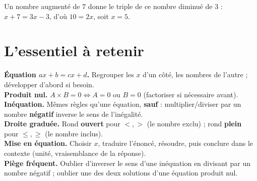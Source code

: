 \begin{illus}
\end{illus}

\begin{exemple}
Un nombre augmenté de $7$ donne le triple de ce nombre diminué de $3$ : $x+7=3x-3$, d'où
$10=2x$, soit $x=5$.
\end{exemple}

\section{L'essentiel à retenir}

\begin{synthese}
\textbf{Équation $ax+b=cx+d$.} Regrouper les $x$ d'un côté, les nombres de l'autre ;
développer d'abord si besoin.\\[4pt]
\textbf{Produit nul.} $A\times B=0\iff A=0$ ou $B=0$ (factoriser si nécessaire avant).\\[4pt]
\textbf{Inéquation.} Mêmes règles qu'une équation, \textbf{sauf} : multiplier/diviser par un
nombre \textbf{négatif} inverse le sens de l'inégalité.\\[4pt]
\textbf{Droite graduée.} Rond \textbf{ouvert} pour $<,>$ (le nombre exclu) ; rond
\textbf{plein} pour $\le,\ge$ (le nombre inclus).\\[4pt]
\textbf{Mise en équation.} Choisir $x$, traduire l'énoncé, résoudre, puis conclure dans le
contexte (unité, vraisemblance de la réponse).\\[4pt]
\textbf{Piège fréquent.} Oublier d'inverser le sens d'une inéquation en divisant par un
nombre négatif ; oublier une des deux solutions d'une équation produit nul.
\end{synthese}


